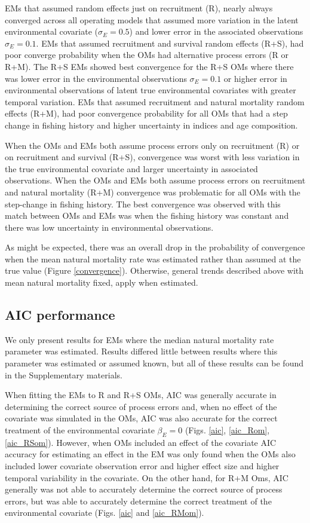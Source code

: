 \documentclass[
  12pt,
]{article}
\begin{document}
EMs that assumed random effects just on recruitment (R), nearly always converged across all operating models that assumed more variation in the latent environmental covariate (\(\sigma_E = 0.5\)) and lower error in the associated observations \(\sigma_E = 0.1\). EMs that assumed recruitment and survival random effects (R+S), had poor converge probability when the OMs had alternative process errors (R or R+M). The R+S EMs showed best convergence for the R+S OMs where there was lower error in the environmental observations \(\sigma_E = 0.1\) or higher error in environmental observations of latent true environmental covariates with greater temporal variation. EMs that assumed recruitment and natural mortality random effects (R+M), had poor convergence probability for all OMs that had a step change in fishing history and higher uncertainty in indices and age composition.

When the OMs and EMs both assume process errors only on recruitment (R) or on recruitment and survival (R+S), convergence was worst with less variation in the true environmental covariate and larger uncertainty in associated observations. When the OMs and EMs both assume process errors on recruitment and natural mortality (R+M) convergence was problematic for all OMs with the step-change in fishing history. The best convergence was observed with this match between OMs and EMs was when the fishing history was constant and there was low uncertainty in environmental observations.

As might be expected, there was an overall drop in the probability of convergence when the mean natural mortality rate was estimated rather than assumed at the true value (Figure \ref{convergence}). Otherwise, general trends described above with mean natural mortality fixed, apply when estimated.

\hypertarget{aic-performance}{%
\subsection*{AIC performance}\label{aic-performance}}

We only present results for EMs where the median natural mortality rate parameter was estimated. Results differed little between results where this parameter was estimated or assumed known, but all of these results can be found in the Supplementary materials.

When fitting the EMs to R and R+S OMs, AIC was generally accurate in determining the correct source of process errors and, when no effect of the covariate was simulated in the OMs, AIC was also accurate for the correct treatment of the environmental covariate \(\beta_E = 0\) (Figs. \ref{aic}, \ref{aic_Rom}, \ref{aic_RSom}). However, when OMs included an effect of the covariate AIC accuracy for estimating an effect in the EM was only found when the OMs also included lower covariate observation error and higher effect size and higher temporal variability in the covariate. On the other hand, for R+M Oms, AIC generally was not able to accurately determine the correct source of process errors, but was able to accurately determine the correct treatment of the environmental covariate (Figs. \ref{aic} and \ref{aic_RMom}).
\end{document}
